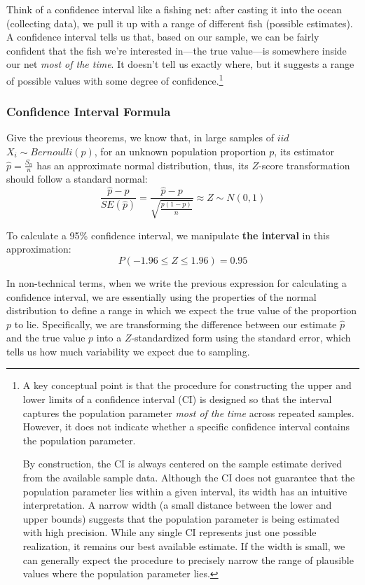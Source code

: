 \documentclass[11pt]{article}
\begin{document}
Think of a confidence interval like a fishing net: after casting it into the ocean (collecting data), we pull it up with a range of different fish (possible estimates). A confidence interval tells us that, based on our sample, we can be fairly confident that the fish we're interested in—the true value—is somewhere inside our net \emph{most of the time}. It doesn't tell us exactly where, but it suggests a range of possible values with some degree of confidence.\footnote{A key conceptual point is that the procedure for constructing the upper and lower limits of a confidence interval (CI) is designed so that the interval captures the population parameter \emph{most of the time} across repeated samples. However, it does not indicate whether a specific confidence interval contains the population parameter.

By construction, the CI is always centered on the sample estimate derived from the available sample data. Although the CI does not guarantee that the population parameter lies within a given interval, its width has an intuitive interpretation. A narrow width (a small distance between the lower and upper bounds) suggests that the population parameter is being estimated with high precision. While any single CI represents just one possible realization, it remains our best available estimate. If the width is small, we can generally expect the procedure to precisely narrow the range of plausible values where the population parameter lies.}


\subsubsection*{Confidence Interval Formula}
Give the previous theorems, we know that, in large samples of $iid$ $X_i\sim Bernoulli (p)$, for an unknown population proportion \(p\), its estimator \(\hat{p} = \frac{S_n}{n}\) has an approximate normal distribution, thus, its $Z$-score transformation should follow a standard normal:
\[ \frac{\hat{p}-p}{SE(\hat{p})} = \frac{\hat{p} - p}{\sqrt{\frac{p(1-p)}{n}}} \approx Z \sim N(0,1) \]

To calculate a 95\% confidence interval, we manipulate \textbf{the interval} in this approximation:
\[ P(-1.96 \leq Z \leq 1.96) = 0.95 \]

In non-technical terms, when we write the previous expression for calculating a confidence interval, we are essentially using the properties of the normal distribution to define a range in which we expect the true value of the proportion \( p \) to lie. Specifically, we are transforming the difference between our estimate \( \hat{p} \) and the true value \( p \) into a $Z$-standardized form using the standard error, which tells us how much variability we expect due to sampling.
\end{document}
